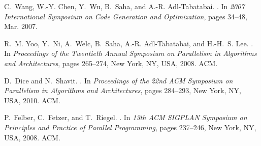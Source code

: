 \documentclass[preprint]{sigplanconf}
\begin{document}
\begin{thebibliography}{10}
C.~Wang, W.-Y. Chen, Y.~Wu, B.~Saha, and A.-R. Adl-Tabatabai.
.
\newblock In \emph{2007 International Symposium on Code Generation and
  Optimization}, pages 34--48, Mar. 2007.

R.~M. Yoo, Y.~Ni, A.~Welc, B.~Saha, A.-R. Adl-Tabatabai, and H.-H.~S. Lee.
.
\newblock In \emph{Proceedings of the Twentieth Annual Symposium on Parallelism
  in Algorithms and Architectures}, pages 265--274, New York, NY, USA, 2008.
  ACM.

D.~Dice and N.~Shavit.
.
\newblock In \emph{Proceedings of the 22nd ACM Symposium on Parallelism in
  Algorithms and Architectures}, pages 284--293, New York, NY, USA, 2010. ACM.

P.~Felber, C.~Fetzer, and T.~Riegel.
.
\newblock In \emph{13th ACM SIGPLAN Symposium on Principles and Practice of
  Parallel Programming}, pages 237--246, New York, NY, USA, 2008. ACM.

\end{thebibliography}
\end{document}
